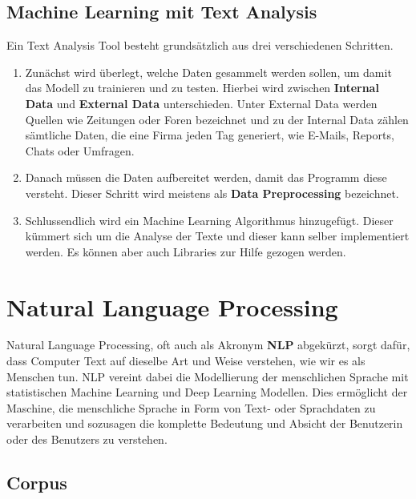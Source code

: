 \subsection{Machine Learning mit Text Analysis}\label{subsec:machine-learning-with-text-analysis}

Ein Text Analysis Tool besteht grundsätzlich aus drei verschiedenen Schritten.

\begin{enumerate}
    \item Zunächst wird überlegt, welche Daten gesammelt werden sollen, um damit das Modell zu trainieren und zu testen.
    Hierbei wird zwischen \textbf{Internal Data} und \textbf{External Data} unterschieden.
    Unter External Data werden Quellen wie Zeitungen oder Foren bezeichnet und zu der Internal Data zählen sämtliche Daten, die eine Firma jeden Tag generiert, wie E-Mails, Reports, Chats oder Umfragen.
    \item Danach müssen die Daten aufbereitet werden, damit das Programm diese versteht.
    Dieser Schritt wird meistens als \textbf{Data Preprocessing} bezeichnet.
    \item Schlussendlich wird ein Machine Learning Algorithmus hinzugefügt.
    Dieser kümmert sich um die Analyse der Texte und dieser kann selber implementiert werden.
Es können aber auch Libraries zur Hilfe gezogen werden.\cite{machineLearningTextAnalysis}
\end{enumerate}

\section{Natural Language Processing}\label{sec:natural-language-processing}

Natural Language Processing, oft auch als Akronym \textbf{NLP} abgekürzt, sorgt dafür, dass Computer Text auf dieselbe Art und Weise verstehen, wie wir es als Menschen tun.
NLP vereint dabei die Modellierung der menschlichen Sprache mit statistischen Machine Learning und Deep Learning Modellen.
Dies ermöglicht der Maschine, die menschliche Sprache in Form von Text- oder Sprachdaten zu verarbeiten und sozusagen die komplette Bedeutung und Absicht der Benutzerin oder des Benutzers zu verstehen.\cite{naturalLanguageProcessingIBM}

\subsection{Corpus}\label{subsec:corpus}

